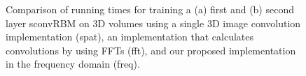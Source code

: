 \begin{figure}[t!]

\caption{Comparison of running times for training a (a) first and (b) second
layer sconvRBM on 3D volumes using a single 3D image convolution implementation
(spat), an implementation that calculates convolutions by using FFTs (fft), and
our proposed implementation in the frequency domain (freq).}
\label{fig:run_oasis}
\end{figure}

